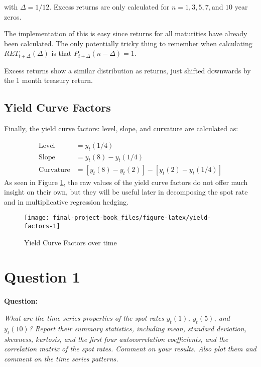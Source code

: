 \documentclass[openany]{book}
\theoremstyle{definition}
\theoremstyle{definition}
\theoremstyle{definition}
\theoremstyle{remark}
\begin{document}
with \(\Delta = 1 / 12\). Excess returns are only calculated for
\(n = 1, 3, 5, 7, \text{and } 10\) year zeros.

The implementation of this is easy since returns for all maturities have
already been calculated. The only potentially tricky thing to remember
when calculating \(RET_{t+\Delta}(\Delta)\) is that
\(P_{t+\Delta}(n-\Delta) = 1\).

Excess returns show a similar distribution as returns, just shifted
downwards by the 1 month treasury return.

\hypertarget{yield-curve-factors}{%
\section{Yield Curve Factors}\label{yield-curve-factors}}

Finally, the yield curve factors: level, slope, and curvature are
calculated as:

\[
\begin{aligned}
  \text{Level} &= y_t(1/4) \\
   \text{Slope} &= y_t(8) - y_t(1/4) \\
   \text{Curvature} &= [ y_t(8) - y_t(2) ]  - [ y_t(2) - y_t(1/4) ]
\end{aligned}
\] As seen in Figure \ref{fig:yield-factors}, the raw values of the
yield curve factors do not offer much insight on their own, but they
will be useful later in decomposing the spot rate and in multiplicative
regression hedging.

\small

\begin{figure}[H]

{\centering \texttt{[image: final-project-book\_files/figure-latex/yield-factors-1]} 

}

\caption{Yield Curve Factors over time}\label{fig:yield-factors}
\end{figure}

\normalsize

\small

\normalsize

\hypertarget{q1}{%
\chapter{Question 1}\label{q1}}

\textbf{Question:}

\emph{What are the time-series properties of the spot rates \(y_t(1)\),
\(y_t(5)\), and \(y_t(10)\)? Report their summary statistics, including
mean, standard deviation, skewness, kurtosis, and the first four
autocorrelation coefficients, and the correlation matrix of the spot
rates. Comment on your results. Also plot them and comment on the time
series patterns.}
\end{document}
